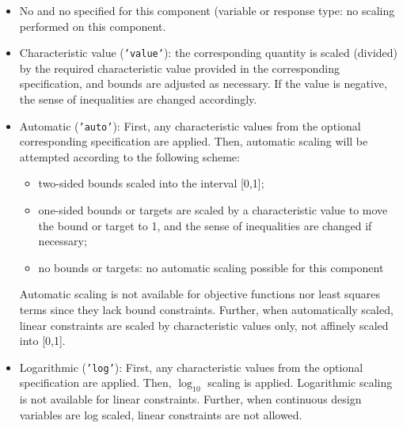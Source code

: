 \begin{itemize}

\item No  and no  specified
  for this component (variable or response type: no scaling performed
  on this component.

\item Characteristic value ({\tt 'value'}): the corresponding quantity
  is scaled (divided) by the required characteristic value provided in
  the corresponding  specification, and bounds are
  adjusted as necessary. If the value is negative, the sense of
  inequalities are changed accordingly.

\item Automatic ({\tt 'auto'}): First, any characteristic values from
  the optional corresponding  specification are
  applied. Then, automatic scaling will be attempted according to the
  following scheme:

  \begin{itemize}
  
  \item two-sided bounds scaled into the interval [0,1];
	
  \item one-sided bounds or targets are scaled by a characteristic
    value to move the bound or target to 1, and the sense of
    inequalities are changed if necessary;

  \item no bounds or targets: no automatic scaling possible for this component
    
  \end{itemize}

  Automatic scaling is not available for objective functions nor least
  squares terms since they lack bound constraints. Further, when
  automatically scaled, linear constraints are scaled by
  characteristic values only, not affinely scaled into [0,1].

\item Logarithmic ({\tt 'log'}): First, any characteristic values from
  the optional  specification are applied. Then,
  $\log_{10}$ scaling is applied. Logarithmic scaling is not available
  for linear constraints. Further, when continuous design variables
  are log scaled, linear constraints are not allowed.

\end{itemize}

